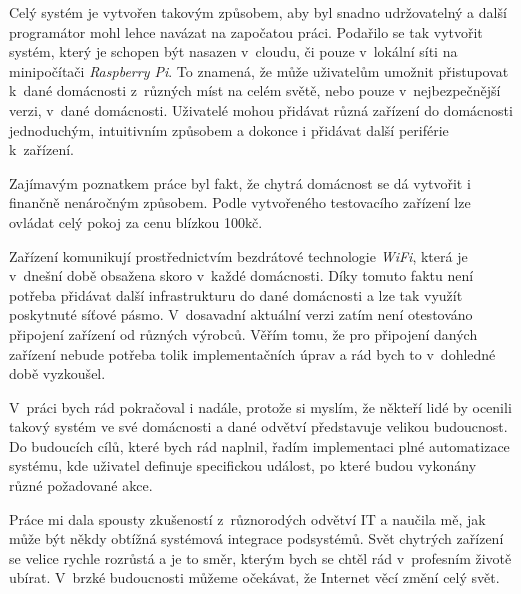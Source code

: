Celý systém je vytvořen takovým způsobem, aby byl snadno udržovatelný a další programátor mohl lehce navázat na započatou práci.
Podařilo se tak vytvořit systém, který je schopen být nasazen v~cloudu, či pouze v~lokální síti na minipočítači \emph{Raspberry Pi}.
To znamená, že může uživatelům umožnit přistupovat k~dané domácnosti z~různých míst na celém světě, nebo pouze v~nejbezpečnější verzi, v~dané domácnosti.
Uživatelé mohou přidávat různá zařízení do domácnosti jednoduchým, intuitivním způsobem a dokonce i přidávat další periférie k~zařízení.

Zajímavým poznatkem práce byl fakt, že chytrá domácnost se dá vytvořit i finančně nenáročným způsobem.
Podle vytvořeného testovacího zařízení lze ovládat celý pokoj za cenu blízkou 100kč.

Zařízení komunikují prostřednictvím bezdrátové technologie \emph{WiFi}, která je v~dnešní době obsažena skoro v~každé domácnosti.
Díky tomuto faktu není potřeba přidávat další infrastrukturu do dané domácnosti a lze tak využít poskytnuté síťové pásmo.
V~dosavadní aktuální verzi zatím není otestováno připojení zařízení od různých výrobců.
Věřím tomu, že pro připojení daných zařízení nebude potřeba tolik implementačních úprav a rád bych to v~dohledné době vyzkoušel.

V~práci bych rád pokračoval i nadále, protože si myslím, že někteří lidé by ocenili takový systém ve své domácnosti a dané odvětví představuje velikou budoucnost.
Do budoucích cílů, které bych rád naplnil, řadím implementaci plné automatizace systému, kde uživatel definuje specifickou událost, po které budou vykonány různé požadované akce.

Práce mi dala spousty zkušeností z~různorodých odvětví IT a naučila mě, jak může být někdy obtížná systémová integrace podsystémů.
Svět chytrých zařízení se velice rychle rozrůstá a je to směr, kterým bych se chtěl rád v~profesním životě ubírat.
V~brzké budoucnosti můžeme očekávat, že Internet věcí změní celý svět.

